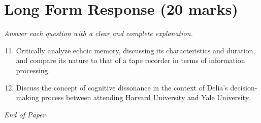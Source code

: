\documentclass[12pt]{article}
\begin{document}
\section*{Long Form Response (20 marks)}
\textit{Answer each question with a clear and complete explanation.}
\begin{enumerate}[label=\arabic*.]
\setcounter{enumi}{10}
\item Critically analyze echoic memory, discussing its characteristics and duration, and compare its nature to that of a tape recorder in terms of information processing.
\item Discuss the concept of cognitive dissonance in the context of Delia's decision-making process between attending Harvard University and Yale University.
\end{enumerate}

\vfill
\noindent\textit{End of Paper}
\end{document}
